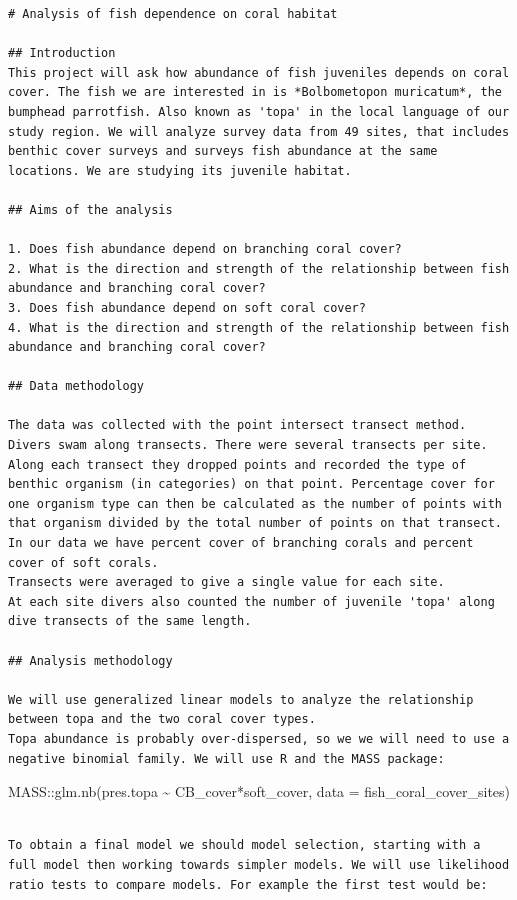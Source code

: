 \documentclass[
  letterpaper,
  DIV=11,
  numbers=noendperiod]{scrreprt}
\begin{document}
\begin{verbatim}
# Analysis of fish dependence on coral habitat

## Introduction
This project will ask how abundance of fish juveniles depends on coral cover. The fish we are interested in is *Bolbometopon muricatum*, the bumphead parrotfish. Also known as 'topa' in the local language of our study region. We will analyze survey data from 49 sites, that includes benthic cover surveys and surveys fish abundance at the same locations. We are studying its juvenile habitat. 

## Aims of the analysis 

1. Does fish abundance depend on branching coral cover? 
2. What is the direction and strength of the relationship between fish abundance and branching coral cover? 
3. Does fish abundance depend on soft coral cover? 
4. What is the direction and strength of the relationship between fish abundance and branching coral cover? 

## Data methodology

The data was collected with the point intersect transect method. Divers swam along transects. There were several transects per site.  Along each transect they dropped points and recorded the type of benthic organism (in categories) on that point. Percentage cover for one organism type can then be calculated as the number of points with that organism divided by the total number of points on that transect. In our data we have percent cover of branching corals and percent cover of soft corals. 
Transects were averaged to give a single value for each site. 
At each site divers also counted the number of juvenile 'topa' along dive transects of the same length. 

## Analysis methodology 

We will use generalized linear models to analyze the relationship between topa and the two coral cover types. 
Topa abundance is probably over-dispersed, so we we will need to use a negative binomial family. We will use R and the MASS package: 
\end{verbatim}

MASS::glm.nb(pres.topa \textasciitilde{} CB\_cover*soft\_cover, data =
fish\_coral\_cover\_sites)

\begin{verbatim}

To obtain a final model we should model selection, starting with a full model then working towards simpler models. We will use likelihood ratio tests to compare models. For example the first test would be: 
\end{verbatim}
\end{document}
